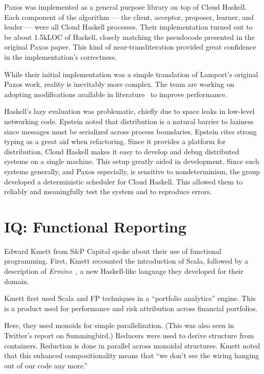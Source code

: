 \documentclass{jfp1}
\begin{document}
Paxos was implemented as a general purpose library on top of Cloud
Haskell. Each component of the algorithm --- the client, acceptor,
proposer, learner, and leader --- were all Cloud Haskell processes.
Their implementation turned out to be about 1.5kLOC of Haskell,
closely matching the pseudocode presented in the original Paxos paper.
This kind of near-transliteration provided great confidence in the
implementation's correctness.

While their initial implementation was a simple translation of
Lamport's original Paxos work, reality is inevitably more
complex. The team are working on adopting modifications available
in literature~\cite{Chandra:2007:Paxos} to improve performance.

Haskell's lazy evaluation was problematic, chiefly due to space leaks
in low-level networking code. Epstein noted that distribution is a
natural barrier to laziness since messages must be serialized across
process boundaries. Epstein cites strong typing as a great aid when
refactoring. Since it provides a platform for distribution, Cloud
Haskell makes it easy to develop and debug distributed systems on a
single machine. This setup greatly aided in development. Since such
systems generally, and Paxos especially, is sensitive to
nondeterminism, the group developed a deterministic scheduler for
Cloud Haskell. This allowed them to reliably and meaningfully test the
system and to reproduce errors.

\section{IQ: Functional Reporting}


Edward Kmett from S\&P Capital spoke about their use of functional
programming. First, Kmett recounted the introduction of Scala,
followed by a description of
\textit{Ermine}~\cite{Compall:2014:Ermine}, a new Haskell-like
language they developed for their domain.

Kmett first used Scala and FP techniques in a ``portfolio analytics''
engine. This is a product used for performance and risk attribution
across financial portfolios.

Here, they used monoids for simple parallelization. (This was also
seen in Twitter's report on Summingbird.) Reducers were used to
derive structure from containers.  Reduction
is done in parallel across monoidal structures. Kmett noted that this
enhanced compositionality means that ``we don't see the wiring hanging
out of our code any more.''
\end{document}
